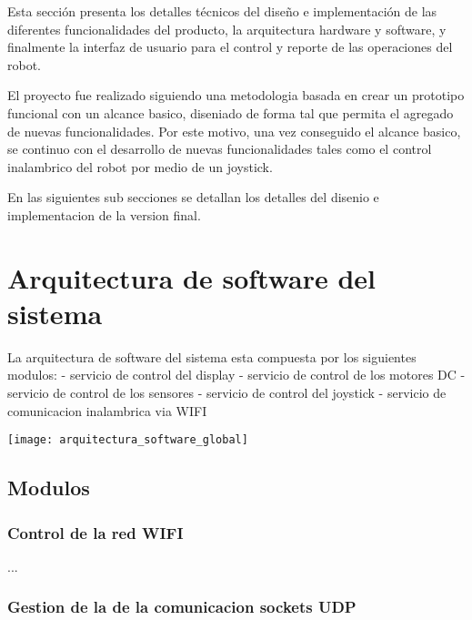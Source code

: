 
Esta sección presenta los detalles técnicos del diseño e implementación de las diferentes funcionalidades del producto, la arquitectura hardware y software, y finalmente la interfaz de usuario para el control y reporte de las operaciones del robot.

El proyecto fue realizado siguiendo una metodologia basada en crear un prototipo funcional con un alcance basico, diseniado de forma tal que permita el agregado de nuevas funcionalidades.
Por este motivo, una vez conseguido el alcance basico, se continuo con el desarrollo de nuevas funcionalidades tales como el control inalambrico del robot por medio de un joystick.

En las siguientes sub secciones se detallan los detalles del disenio e implementacion de la version final.



\section{Arquitectura de software del sistema}

La arquitectura de software del sistema esta compuesta por los siguientes modulos:
- servicio de control del display
- servicio de control de los motores DC
- servicio de control de los sensores
- servicio de control del joystick
- servicio de comunicacion inalambrica via WIFI



\begin{center}
  \texttt{[image: arquitectura\_software\_global]}
    \label{fig:arquitectura_software_global}

\end{center}

\subsection{Modulos}
\subsubsection{Control de la red WIFI}
...

\subsubsection{Gestion de la  de la comunicacion sockets UDP}

